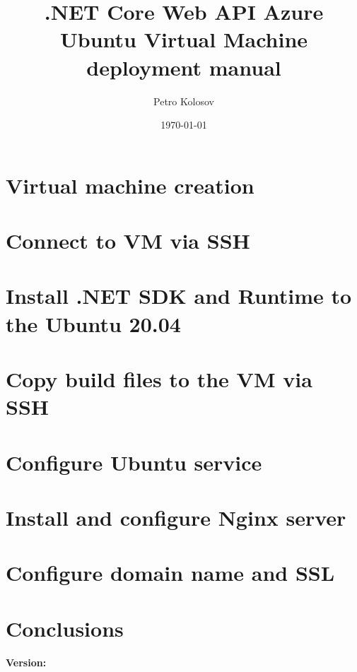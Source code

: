 \documentclass[12pt,letterpaper,oneside,reqno]{amsart}
\title[.NET Core Web API Azure Ubuntu Virtual Machine deployment manual]
{.NET Core Web API Azure Ubuntu Virtual Machine deployment manual}
\author[Petro Kolosov]{Petro Kolosov}
\date{\today}
\begin{document}
    \begin{abstract}
        
    \end{abstract}

    \maketitle

    \tableofcontents



    \section{Virtual machine creation}\label{sec:virtual-machine-creation}
    


    \section{Connect to VM via SSH}\label{sec:connect-to-vm-via-ssh}
    


    \section{Install .NET SDK and Runtime to the Ubuntu 20.04}\label{sec:install-.net-sdk-to-ubuntu-20.04}
    


    \section{Copy build files to the VM via SSH}\label{sec:copy-build-files-to-the-vm-via-ssh}
    


    \section{Configure Ubuntu service}\label{sec:configure-ubuntu-service}
    


    \section{Install and configure Nginx server}\label{sec:install-and-configure-nginx-server}
    


    \section{Configure domain name and SSL}\label{sec:configure-domain-name-and-ssl}
    


    \section{Conclusions}\label{sec:conclusions}
    

    
    
    \noindent \textbf{Version:} 
\end{document}
